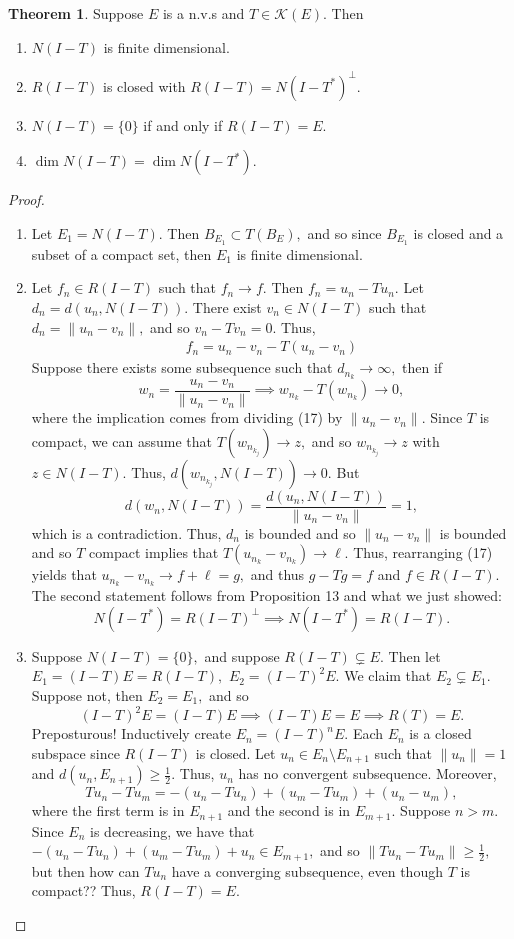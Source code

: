 \documentclass[10pt, oneside]{article}
\theoremstyle{definition}
\newtheorem{thm}{Theorem}
\begin{document}
\begin{thm}
    Suppose $E$ is a n.v.s and $T \in \mathcal{K}(E).$ Then 
    \begin{enumerate}
        \item $N(I - T)$ is finite dimensional.
        \item $R(I - T)$ is closed with $R(I - T) = N(I-T^*)^\perp.$
        \item $N(I - T) = \{0\}$ if and only if $R(I- T) = E.$
        \item $\dim N(I-T) = \dim N(I - T^*).$
    \end{enumerate}
\end{thm}
\begin{proof}
\begin{enumerate}
    \item Let $E_1 = N(I-T).$ Then $B_{E_1} \subset T(B_{E}),$ and so since $B_{E_1}$ is closed and a subset of a compact set, then $E_1$ is finite dimensional.
    \item Let $f_n \in R(I-T)$ such that $f_n \to f.$ Then $f_n = u_n - Tu_n.$ Let $d_n = d(u_n, N(I-T)).$ There exist $v_n \in N(I - T)$ such that $d_n = \|u_n - v_n\|,$ and so $v_n - Tv_n = 0.$ Thus, 
    \begin{align}
    f_n = u_n - v_n - T(u_n - v_n)    
    \end{align}
    Suppose there exists some subsequence such that $d_{n_k} \to \infty,$ then if 
    \[w_n = \frac{u_n - v_n}{\|u_n - v_n\|} \implies  w_{n_k} - T(w_{n_k}) \to 0,\] where the implication comes from dividing (17) by $\|u_n - v_n\|.$ Since $T$ is compact, we can assume that $T(w_{n_{k_j}}) \to z,$ and so $w_{n_{k_j}} \to z$ with $z\in N(I - T).$ Thus, $d(w_{n_{k_j}}, N(I-T)) \to 0.$ But 
    \[d(w_n, N(I-T)) = \frac{d(u_n, N(I-T))}{\|u_n - v_n\|} = 1,\] which is a contradiction. Thus, $d_n$ is bounded and so $\|u_n - v_n\|$ is bounded and so $T$ compact implies that $T(u_{n_k} - v_{n_k}) \to \ell.$ Thus, rearranging (17) yields that $u_{n_k} - v_{n_k} \to f + \ell = g,$ and  thus $g - Tg = f$ and $f \in R(I-T).$ The second statement follows from Proposition 13 and what we just showed: 
    \[N(I-T^*) = R(I-T)^\perp \implies N(I - T^*) = R(I - T).\]
    \item Suppose $N(I - T) = \{0\},$ and suppose $R(I-T)\subsetneq E.$ Then let $E_1 = (I-T)E = R(I-T),$ $E_2 = (I-T)^2 E.$ We claim that $E_2 \subsetneq E_1.$ Suppose not, then $E_2 = E_1,$ and so 
    \[(I-T)^2E = (I-T)E \implies (I-T)E = E \implies R(T) = E.\] Preposturous! Inductively create $E_n = (I - T)^nE.$ Each $E_n$ is a closed subspace since $R(I-T)$ is closed. Let $u_n \in E_{n}\setminus E_{n+1}$ such that $\|u_n\| = 1$ and $d(u_n, E_{n+1}) \geq \frac{1}{2}.$ Thus, $u_n$ has no convergent subsequence. Moreover, 
    \[Tu_n - Tu_m = -(u_n - Tu_n) + (u_m - Tu_m) + (u_n - u_m),\] where the first term is in $E_{n+1}$ and the second is in $E_{m+1}.$ Suppose $n >m.$ Since $E_n$ is decreasing, we have that $-(u_n - Tu_n) + (u_m - Tu_m) + u_n \in E_{m+1},$ and so $\|Tu_n - Tu_m\| \geq \frac{1}{2},$ but then how can $Tu_n$ have a converging subsequence, even though $T$ is compact?? Thus, $R(I - T) = E.$


\end{enumerate}
\end{proof}
\end{document}
